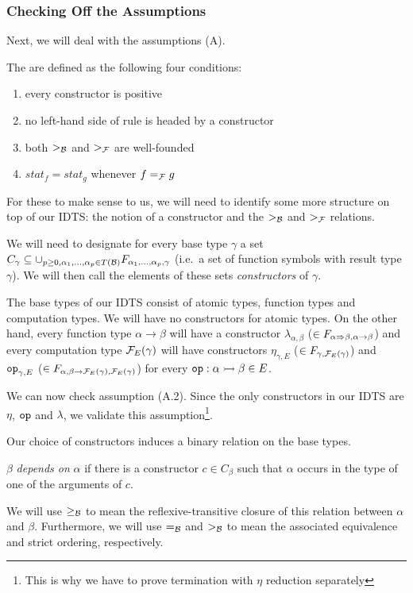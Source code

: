 \subsubsection{Checking Off the Assumptions}

Next, we will deal with the assumptions (A).

\begin{definition}
  The  are defined as the following four conditions:
  \begin{enumerate}
  \item every constructor is positive
  \item no left-hand side of rule is headed by a constructor
  \item both $>_{\mathcal{B}}$ and $>_{\mathcal{F}}$ are well-founded
  \item $stat_f = stat_g$ whenever $f =_{\mathcal{F}} g$
  \end{enumerate}
\end{definition}

For these to make sense to us, we will need to identify some more structure
on top of our IDTS: the notion of a constructor and the $>_{\mathcal{B}}$ and $>_{\mathcal{F}}$
relations.

We will need to designate for every base type $\gamma$ a set
$C_\gamma \subseteq \cup_{p \ge 0, \alpha_1, \ldots, \alpha_p \in T(\mathcal{B})}
F_{\alpha_1, \ldots, \alpha_p, \gamma}$ (i.e.\ a set of function symbols
with result type $\gamma$). We will then call the elements of these sets
\emph{constructors} of $\gamma$.

The base types of our IDTS consist of atomic types, function types and
computation types. We will have no constructors for atomic types. On the
other hand, every function type $\alpha \to \beta$ will have a constructor
$\lambda_{\alpha, \beta}$ ($\in F_{\alpha \Rightarrow \beta, \alpha \to \beta}$)
and every computation type $\mathcal{F}_E(\gamma)$ will have constructors
$\eta_{\gamma,E}$ ($\in F_{\gamma,\mathcal{F}_E(\gamma)}$) and $\mathtt{op}_{\gamma,E}$
($\in F_{\alpha,\beta \to \mathcal{F}_E(\gamma),\mathcal{F}_E(\gamma)}$) for every
$\mathtt{op} : \alpha \rightarrowtail \beta \in E$.

We can now check assumption (A.2). Since the only constructors in our IDTS
are $\eta$, $\mathtt{op}$ and $\lambda$, we validate this
assumption\footnote{This is why we have to prove termination with $\eta$
  reduction separately}.

Our choice of constructors induces a binary relation on the base types.

\begin{definition}
  $\beta$ \emph{depends on} $\alpha$ if there is a constructor
  $c \in C_\beta$ such that $\alpha$ occurs in the type of one of the
  arguments of $c$.
  
  We will use $\ge_{\mathcal{B}}$ to mean the reflexive-transitive closure of this
  relation between $\alpha$ and $\beta$. Furthermore, we will use $=_{\mathcal{B}}$
  and $>_{\mathcal{B}}$ to mean the associated equivalence and strict ordering,
  respectively.
\end{definition}

